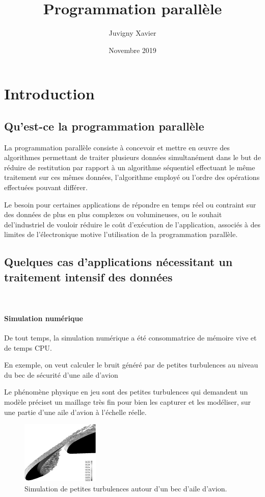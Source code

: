 \documentclass[fleqn,11pt]{article}
\title{Programmation parallèle}
\author{Juvigny Xavier}
\date{Novembre 2019}
\begin{document}
\maketitle
\tableofcontents

\section{Introduction}

\subsection{Qu'est-ce la programmation parallèle}

La programmation parallèle consiste à concevoir et mettre en œuvre des algorithmes permettant de traiter plusieurs données simultanément dans le but de réduire de restitution par rapport à un algorithme séquentiel effectuant le même traitement sur ces mêmes données, l'algorithme employé ou l'ordre des opérations effectuées pouvant différer. 

Le besoin pour certaines applications de répondre en temps réel ou contraint sur des données de plus en plus complexes ou volumineuses, ou le souhait del'industriel de vouloir réduire le coût d'exécution de l'application, associés à des limites de l'électronique motive l'utilisation de la programmation parallèle. 

\subsection{Quelques cas d'applications nécessitant un traitement intensif des données}
\
\paragraph{Simulation numérique }

De tout temps, la simulation numérique a été consommatrice de mémoire vive et de temps CPU. 

En exemple, on veut calculer le bruit généré par de petites turbulences au niveau du bec de sécurité d'une aile d'avion

Le phénomène physique en jeu sont des petites turbulences qui demandent un modèle préciset un maillage très fin pour bien les capturer
et les modéliser, sur une partie d'une aile d'avion à l'échelle réelle.

\begin{figure}[h]
\begin{center}
\includegraphics[width=0.33\textwidth]{SlatWingTurb1}
\caption{Simulation de petites turbulences autour d'un bec d'aile d'avion.}
\end{center}
\end{figure}
\end{document}
